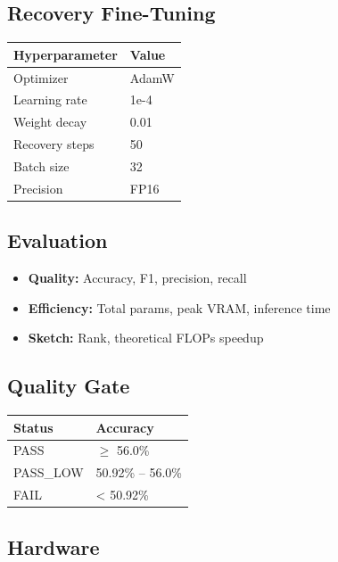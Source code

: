 \subsection{Recovery Fine-Tuning}

\begin{table}[H]
\centering
\small
\begin{tabular}{ll}
\toprule
\textbf{Hyperparameter} & \textbf{Value} \\
\midrule
Optimizer & AdamW \\
Learning rate & 1e-4 \\
Weight decay & 0.01 \\
Recovery steps & 50 \\
Batch size & 32 \\
Precision & FP16 \\
\bottomrule
\end{tabular}
\end{table}

\subsection{Evaluation}

\begin{itemize}
\item \textbf{Quality:} Accuracy, F1, precision, recall
\item \textbf{Efficiency:} Total params, peak VRAM, inference time
\item \textbf{Sketch:} Rank, theoretical FLOPs speedup

\end{itemize}
\subsection{Quality Gate}

\begin{table}[H]
\centering
\small
\begin{tabular}{ll}
\toprule
\textbf{Status} & \textbf{Accuracy} \\
\midrule
PASS & $\ge$ 56.0\% \\
PASS\_LOW & 50.92\% -- 56.0\% \\
FAIL & < 50.92\% \\
\bottomrule
\end{tabular}
\end{table}

\subsection{Hardware}

